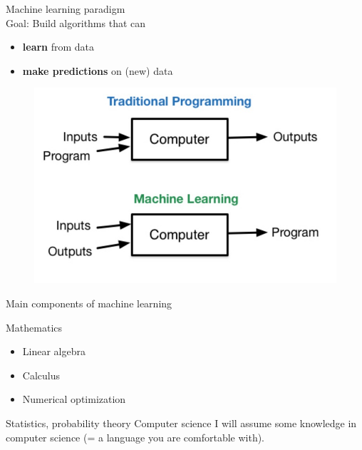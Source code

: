 \documentclass{beamer}
\begin{document}
\begin{frame}{Machine learning paradigm}
~\\
\vfill
Goal: Build algorithms that can 
\begin{itemize}
	\item \textbf{learn} from data
	\item \textbf{make predictions} on (new) data
\end{itemize}
\vfill
\pause
\begin{figure}
\centering
\includegraphics[width=\textwidth]{images/ml_vs_traditional.jpg}
\end{figure}
\vfill
\end{frame}

\begin{frame}{Main components of machine learning}

\vfill
Mathematics
\begin{itemize}
	\item Linear algebra
	\item Calculus
	\item Numerical optimization
\end{itemize}
\vfill
Statistics, probability theory
\vfill
Computer science
\vfill
I will assume some knowledge in computer science (= a language you are comfortable with). 
\vfill
\end{frame}
\end{document}
